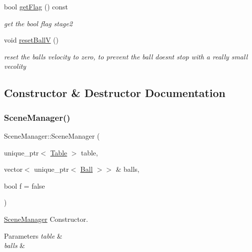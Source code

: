\begin{DoxyCompactItemize}
$$bool \mbox{\hyperlink{class_scene_manager_a425e6d6cae2f7f902027b8a8cba28d0a}{get\+Flag}} () const
\begin{DoxyCompactList}\small\item\em get the bool flag stage2 \end{DoxyCompactList}\item 
\mbox{\label{class_scene_manager_acf825392b2abb023b088d9cae42849f0}} 
void \mbox{\hyperlink{class_scene_manager_acf825392b2abb023b088d9cae42849f0}{reset\+BallV}} ()
\begin{DoxyCompactList}\small\item\em reset the ball\textquotesingle{}s velocity to zero, to prevent the ball doesnt stop with a really small vecolity \end{DoxyCompactList}\end{DoxyCompactItemize}


\subsection{Constructor \& Destructor Documentation}
\mbox{\label{class_scene_manager_aeaf8d1701d0624f47f0274f2642154f2}} 
\subsubsection{\texorpdfstring{Scene\+Manager()}{SceneManager()}}
{\footnotesize\ttfamily Scene\+Manager\+::\+Scene\+Manager (\begin{DoxyParamCaption}\item[{unique\+\_\+ptr$<$ \mbox{\hyperlink{class_table}{Table}} $>$}]{table,  }\item[{vector$<$ unique\+\_\+ptr$<$ \mbox{\hyperlink{class_ball}{Ball}} $>$$>$ \&}]{balls,  }\item[{bool}]{f = {\ttfamily false} }\end{DoxyParamCaption})}



\mbox{\hyperlink{class_scene_manager}{Scene\+Manager}} Constructor. 


\begin{DoxyParams}{Parameters}
{\em table} & \\
\hline
{\em balls} & \\
\hline
\end{DoxyParams}


